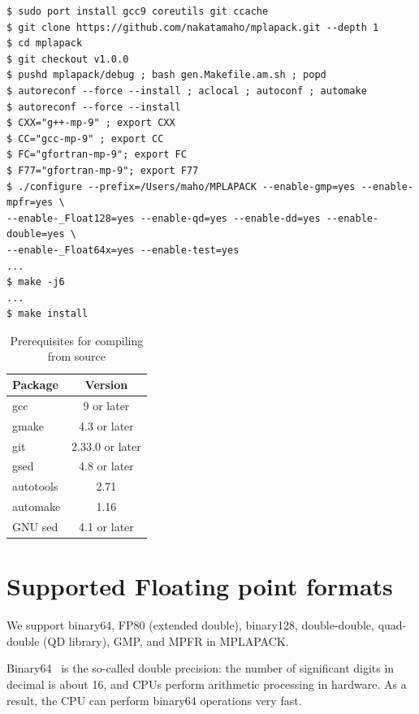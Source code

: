 \documentclass[12pt]{article}
\begin{document}
\begin{verbatim}
$ sudo port install gcc9 coreutils git ccache
$ git clone https://github.com/nakatamaho/mplapack.git --depth 1
$ cd mplapack
$ git checkout v1.0.0
$ pushd mplapack/debug ; bash gen.Makefile.am.sh ; popd
$ autoreconf --force --install ; aclocal ; autoconf ; automake
$ autoreconf --force --install
$ CXX="g++-mp-9" ; export CXX
$ CC="gcc-mp-9" ; export CC
$ FC="gfortran-mp-9"; export FC
$ F77="gfortran-mp-9"; export F77
$ ./configure --prefix=/Users/maho/MPLAPACK --enable-gmp=yes --enable-mpfr=yes \
--enable-_Float128=yes --enable-qd=yes --enable-dd=yes --enable-double=yes \
--enable-_Float64x=yes --enable-test=yes
...
$ make -j6
...
$ make install
\end{verbatim}

\begin{table}
\caption{Prerequisites for compiling from source}
\begin{center}\label{prerequisites}
\begin{tabular}{lc}
Package & Version \\ \hline
gcc & 9 or later \\
gmake & 4.3 or later \\
git & 2.33.0 or later\\
gsed & 4.8 or later \\
autotools & 2.71 \\
automake & 1.16 \\ 
GNU sed & 4.1 or later \\ 
\hline
\end{tabular}
\end{center}
\end{table}

\section{Supported Floating point formats}
\label{sec:floatingpointformat} 
We support binary64, FP80 (extended double), binary128, double-double, quad-double (QD library), GMP, and MPFR in MPLAPACK. 

Binary64~\cite{4610935} is the so-called double precision: the number of significant digits in decimal is about 16, and CPUs perform arithmetic processing in hardware. As a result, the CPU can perform binary64 operations very fast.
\end{document}
